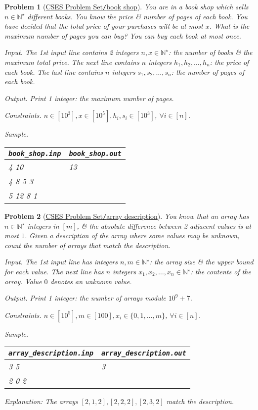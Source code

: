\documentclass{article}
\newtheorem{problem}{Problem}
\begin{document}
\begin{problem}[\href{https://cses.fi/problemset/task/1158}{CSES Problem Set{\tt/}book shop}]
	You are in a book shop which sells $n\in\mathbb{N}^\star$ different books. You know the price \& number of pages of each book. You have decided that the total price of your purchases will be at most $x$. What is the maximum number of pages you can buy? You can buy each book at most once.
	\item {\sf Input.} The 1st input line contains 2 integers $n,x\in\mathbb{N}^\star$: the number of books \& the maximum total price. The next line contains $n$ integers $h_1,h_2,\ldots,h_n$: the price of each book. The last line contains $n$ integers $s_1,s_2,\ldots,s_n$: the number of pages of each book.
	\item {\sf Output.} Print 1 integer: the maximum number of pages.
	\item {\sf Constraints.} $n\in[10^3],x\in[10^5],h_i,s_i\in[10^3]$, $\forall i\in[n]$.
	\item {\sf Sample.}
	\begin{table}[H]
		\centering
		\begin{tabular}{|l|l|}
			\hline
			\verb|book_shop.inp| & \verb|book_shop.out| \\
			\hline
			4 10 & 13 \\
			4 8 5 3 & \\
			5 12 8 1 & \\
			\hline
		\end{tabular}
	\end{table}
\end{problem}

\begin{problem}[\href{https://cses.fi/problemset/task/1746}{CSES Problem Set{\tt/}array description}]
	You know that an array has $n\in\mathbb{N}^\star$ integers in $[m]$, \& the absolute difference between 2 adjacent values is at most $1$. Given a description of the array where some values may be unknown, count the number of arrays that match the description.
	\item {\sf Input.} The 1st input line has integers $n,m\in\mathbb{N}^\star$: the array size \& the upper bound for each value. The next line has $n$ integers $x_1,x_2,\ldots,x_n\in\mathbb{N}^\star$: the contents of the array. Value $0$ denotes an unknown value.
	\item {\sf Output.} Print 1 integer: the number of arrays module $10^9 + 7$.
	\item {\sf Constraints.} $n\in[10^5],m\in[100],x_i\in\{0,1,\ldots,m\}$, $\forall i\in[n]$.
	\item {\sf Sample.}
	\begin{table}[H]
		\centering
		\begin{tabular}{|l|l|}
			\hline
			\verb|array_description.inp| & \verb|array_description.out| \\
			\hline
			3 5 & 3 \\
			2 0 2 & \\
			\hline
		\end{tabular}
	\end{table}
	Explanation: The arrays $[2,1,2],[2,2,2],[2,3,2]$ match the description.
\end{problem}
\end{document}
